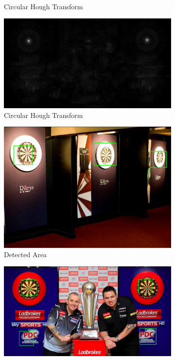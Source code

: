 \documentclass[conference]{IEEEtran}
\begin{document}
\begin{figure}[htb]
\begin{subfigure}{.5\linewidth}
  \caption*{Circular Hough Transform}
  \label{fig:sub1}
\end{subfigure}%
\begin{subfigure}{.5\linewidth}
\vspace{1.1cm}
  \centering
  \includegraphics[width=.9\linewidth]{images/task3/worstcirclehough.png}
  \caption*{Circular Hough Transform}
  \label{fig:sub2}
\end{subfigure}
\begin{subfigure}{.5\linewidth}
\vspace{0.3cm}
  \centering
  \includegraphics[width=.9\linewidth]{images/task3/bestresult.png}
  \caption{Detected Area}
  \label{fig:sub1}
\end{subfigure}%
\begin{subfigure}{.5\linewidth}
\vspace{1.1cm}
  \centering
  \includegraphics[width=.9\linewidth]{images/task3/worstresult.png}

\end{subfigure}
\end{figure}
\end{document}
